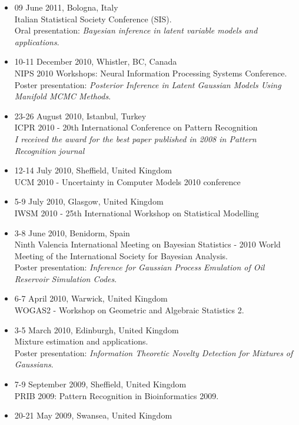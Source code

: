 \documentclass[a4paper,10pt]{article}
\begin{document}
\begin{itemize}
\item 09 June 2011, Bologna, Italy \\
  Italian Statistical Society Conference (SIS).
  \\Oral presentation: \emph{Bayesian inference in latent variable models and applications}.
\item 10-11 December 2010, Whistler, BC, Canada \\
  NIPS 2010 Workshops: Neural Information Processing Systems Conference.
  \\Poster presentation: \emph{Posterior Inference in Latent Gaussian Models Using Manifold MCMC Methods}.
\item 23-26 August 2010, Istanbul, Turkey \\
  ICPR 2010 - 20th International Conference on Pattern Recognition
  \\\emph{I received the award for the best paper published in 2008 in Pattern Recognition journal}
\item 12-14 July 2010, Sheffield, United Kingdom \\
  UCM 2010 - Uncertainty in Computer Models 2010 conference
\item 5-9 July 2010, Glasgow, United Kingdom \\
  IWSM 2010 - 25th International Workshop on Statistical Modelling
\item 3-8 June 2010, Benidorm, Spain \\
  Ninth Valencia International Meeting on Bayesian Statistics - 2010 World Meeting of the International Society for Bayesian Analysis.
  \\Poster presentation: \emph{Inference for Gaussian Process Emulation of Oil Reservoir Simulation Codes}.
\item 6-7 April 2010, Warwick, United Kingdom \\
  WOGAS2 - Workshop on Geometric and Algebraic Statistics 2.
\item 3-5 March 2010, Edinburgh, United Kingdom \\
  Mixture estimation and applications.
  \\Poster presentation: \emph{Information Theoretic Novelty Detection for Mixtures of Gaussians}.
\item 7-9 September 2009, Sheffield, United Kingdom \\
  PRIB 2009: Pattern Recognition in Bioinformatics 2009.
\item 20-21 May 2009, Swansea, United Kingdom \\

\end{itemize}
\end{document}
